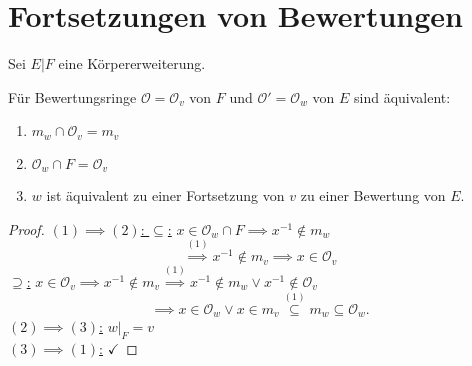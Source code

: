 \section{Fortsetzungen von Bewertungen}
Sei $E|F$ eine Körpererweiterung.

\begin{lemma}
    Für Bewertungsringe $\mathcal{O}=\mathcal{O}_v$ von $F$ und $\mathcal{O}' = \mathcal{O}_w$ von $E$ sind äquivalent:
    \begin{enumerate}[label=(\arabic*)]
        \item $m_w \cap \mathcal{O}_v = m_v$
        \item $\mathcal{O}_w \cap F = \mathcal{O}_v$
        \item $w$ ist äquivalent zu einer Fortsetzung von $v$ zu einer Bewertung von $E$.
    \end{enumerate}
\end{lemma}
\begin{proof}
    \underline{$(1) \implies (2)$: $\subseteq$:} $x \in \mathcal{O}_w \cap F \implies x^{-1} \notin m_w$
    $$ \stackrel{(1)}{\implies} x^{-1} \notin m_v \implies x \in \mathcal{O}_v$$
    \underline{$\supseteq$:} $x \in \mathcal{O}_v \implies x^{-1} \notin m_v \stackrel{(1)}{\implies} x^{-1} \notin m_w \lor x^{-1} \notin \mathcal{O}_v$
    $$ \implies x \in \mathcal{O}_w \lor x \in m_v \stackrel{(1)}{\subseteq} m_w \subseteq \mathcal{O}_w.$$ 
    \underline{$(2) \implies (3)$:} $ w|_F = v$\\
    \underline{$(3) \implies (1)$:} $\checkmark$
\end{proof}

